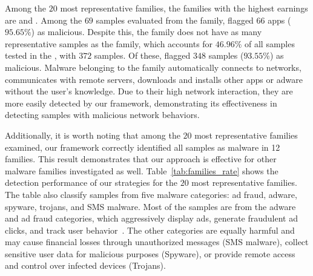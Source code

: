 Among the $20$ most representative families, the families with the highest earnings are \gps and \dwg. Among the $69$ samples evaluated from the \dwg family, \droidxpflow flagged $66$ apps ($95.65\%$) as malicious. Despite this, the \dwg family does not have as many representative samples as the \gps family, which accounts for $46.96\%$ of all samples tested in the \fds, with $372$ samples. Of these, \droidxpflow flagged $348$ samples ($93.55$\%) as malicious. Malware belonging to the \gps family automatically connects to networks, communicates with remote servers, downloads and installs other apps or adware without the user’s knowledge\cite{DBLP:journals/jnca/WangCYYPJ19}. Due to their high network interaction, they are more easily detected by our framework, demonstrating its effectiveness in detecting samples with malicious network behaviors.

Additionally, it is worth noting that among the $20$ most representative families examined, our framework correctly identified all samples as malware in 12 families. This result demonstrates that our approach is effective for other malware families investigated as well. Table~\ref{tab:families_rate} shows the detection performance of our strategies for the $20$ most representative families. The table also classify samples from five malware categories: ad fraud, adware, spyware, trojans, and SMS malware. Most of the samples are from the adware and ad fraud categories, which aggressively display ads, generate fraudulent ad clicks, and track user behavior~\cite{DBLP:journals/spe/FallahB22}. The other categories are equally harmful and may cause financial losses through unauthorized messages (SMS malware), collect sensitive user data for malicious purposes (Spyware), or provide remote access and control over infected devices (Trojans).



